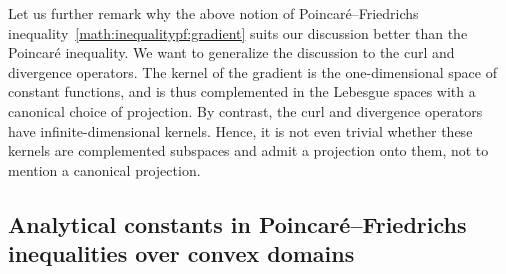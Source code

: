 \documentclass[10pt,a4paper]{article}
\begin{document}
\begin{remark}
    Let us further remark why the above notion of Poincar\'e--Friedrichs inequality~\eqref{math:inequalitypf:gradient} suits our discussion better than the Poincar\'e inequality. 
    We want to generalize the discussion to the curl and divergence operators. 
    The kernel of the gradient is the one-dimensional space of constant functions, and is thus complemented in the Lebesgue spaces with a canonical choice of projection. 
    By contrast, the curl and divergence operators have infinite-dimensional kernels. 
    Hence, it is not even trivial whether these kernels are complemented subspaces and admit a projection onto them, not to mention a canonical projection. 
\end{remark}





\subsection{Analytical constants in Poincar\'e--Friedrichs inequalities over convex domains} \label{section: PX_convex}
\end{document}
